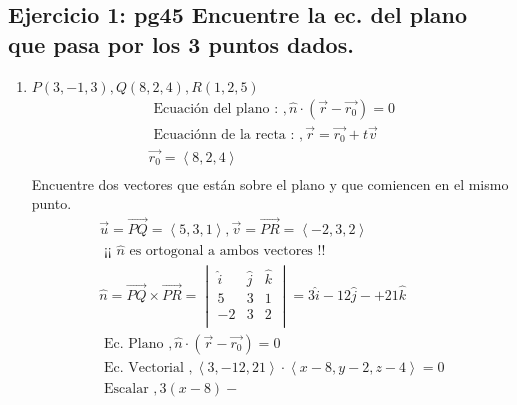 \documentclass{article}
\begin{document}
\subsection{Ejercicio 1: pg45 Encuentre la ec. del plano que pasa por los 3 puntos dados.}
\begin{enumerate}
    \item $P(3,-1,3), Q(8,2,4), R(1,2,5)$
    \begin{align*}
        \text{  Ecuación del plano :   }, \hat{n} \cdot (\vec{r}- \vec{r_0}) = 0\\
        \text{  Ecuaciónn de la recta :   }, \vec{r} = \vec{r_0}+t \vec{v} \\ 
        \vec{r_0} = \left\langle 8,2,4 \right\rangle  \\ 
    \end{align*}
    Encuentre dos vectores que están sobre el plano y que comiencen en el mismo punto.
    \begin{align*}
        \vec{u}= \overrightarrow{PQ} = \left\langle 5,3,1  \right\rangle, \vec{v}= \overrightarrow{PR}= \left\langle -2,3,2 \right\rangle \\ 
        \text{  ¡¡ $\hat{n}$ es ortogonal a ambos vectores !! } \\ 
        \hat{n} = \overrightarrow{PQ} \times \overrightarrow{PR} = \begin{vmatrix}
            \hat{i}& \hat{j}& \hat{k} \\
            5 & 3 & 1 \\ 
            -2 & 3 & 2 \\   
        \end{vmatrix} = 3 \hat{i} - 12 \hat{j} -+ 21 \hat{k} \\ 
        \text{  Ec. Plano  }, \hat{n} \cdot ( \vec{r} - \vec{r_0}) = 0 \\ 
        \text{  Ec. Vectorial  }, \left\langle 3,-12,21 \right\rangle \cdot \left\langle x-8,y-2,z-4 \right\rangle = 0 \\ 
        \text{  Escalar  }, 3(x-8)-  
    \end{align*}


\end{enumerate}
\end{document}
